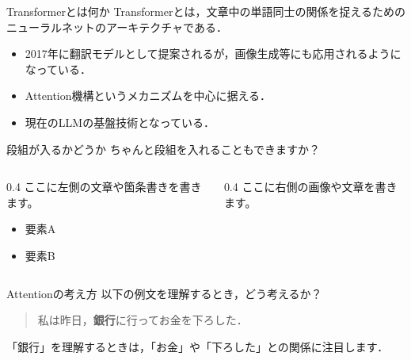 \documentclass[aspectratio=169,professionalfonts]{beamer}
\begin{document}

\begin{frame}{Transformerとは何か}
  Transformerとは，文章中の単語同士の関係を捉えるための
  ニューラルネットのアーキテクチャである．

  \begin{itemize}
    \item 2017年に翻訳モデルとして提案されるが，画像生成等にも応用されるようになっている．
    \item Attention機構というメカニズムを中心に据える．
    \item 現在のLLMの基盤技術となっている．
  \end{itemize}
\end{frame}


\begin{frame}{段組が入るかどうか}
  ちゃんと段組を入れることもできますか？
  
  \begin{columns}
    \centering
    \begin{column}{0.4\textwidth}
      ここに左側の文章や箇条書きを書きます。
      \begin{itemize}
        \item 要素A
        \item 要素B
      \end{itemize}
    \end{column}
    
    \begin{column}{0.4\textwidth}
      ここに右側の画像や文章を書きます。
    \end{column}
  \end{columns}
\end{frame}

\begin{frame}{Attentionの考え方}
  以下の例文を理解するとき，どう考えるか？

  \begin{quote}
    私は昨日，\textbf{銀行}に行ってお金を下ろした．
  \end{quote}

  「銀行」を理解するときは，「お金」や「下ろした」との関係に注目します．
\end{frame}
\end{document}
